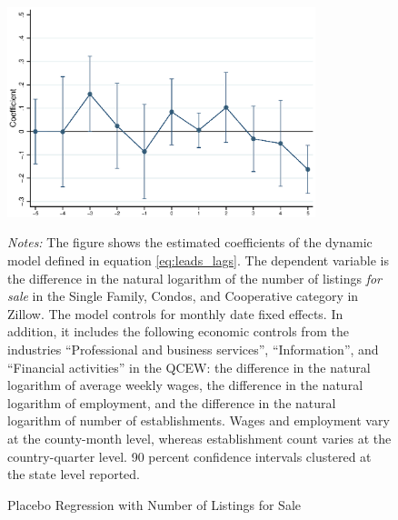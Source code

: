 \begin{figure}[htb!]\centering
	\caption{Placebo Regression with Number of Listings for Sale}
	\label{fig:placebo_nlist}
	\includegraphics[width = 0.8\textwidth]
		{../../analysis/first_differences_nlist/output/fd_placebo.eps}	
	\begin{minipage}{0.95\textwidth}\footnotesize
		\textit{Notes:} The figure shows the estimated coefficients of the dynamic model defined 
		in equation \autoref{eq:leads_lags}. The dependent variable is the difference in the natural 
		logarithm of the number of listings \textit{for sale} in the Single Family, Condos, and 
		Cooperative category in Zillow. The model controls for monthly date fixed effects. In 
		addition, it includes the following economic controls from the industries ``Professional and 
		business services'', ``Information'', and ``Financial activities'' in the QCEW: the difference 
		in the natural logarithm of average weekly wages, the difference in the natural logarithm 
		of employment, and the difference in the natural logarithm of number of establishments. Wages 
		and employment vary at the county-month level, whereas establishment count varies at the 
		country-quarter level. 90 percent confidence intervals clustered at the state level reported. 
	\end{minipage}
\end{figure}

